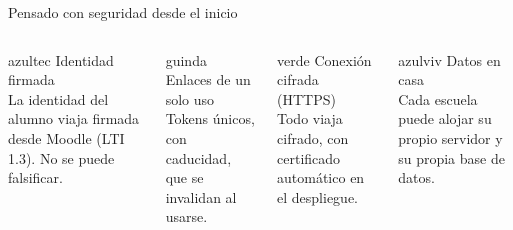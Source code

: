 \begin{frame}{Pensado con seguridad desde el inicio}
\vspace{0.3cm}
\begin{columns}[T]
\begin{tarjetabox}{azultec}
{\demi\color{azultec}Identidad firmada}\\[2pt]\scriptsize
La identidad del alumno viaja firmada desde Moodle (LTI 1.3). No se puede falsificar.
\end{tarjetabox}
\begin{tarjetabox}{guinda}
{\demi\color{guinda}Enlaces de un solo uso}\\[2pt]\scriptsize
Tokens \'unicos, con caducidad, que se invalidan al usarse.
\end{tarjetabox}
\begin{tarjetabox}{verde}
{\demi\color{verde}Conexi\'on cifrada (HTTPS)}\\[2pt]\scriptsize
Todo viaja cifrado, con certificado autom\'atico en el despliegue.
\end{tarjetabox}
\begin{tarjetabox}{azulviv}
{\demi\color{azulviv}Datos en casa}\\[2pt]\scriptsize
Cada escuela puede alojar su propio servidor y su propia base de datos.
\end{tarjetabox}
\end{columns}
\end{frame}


